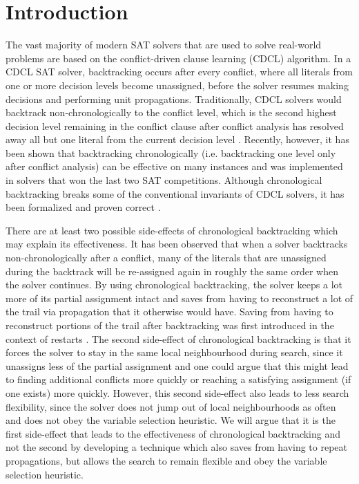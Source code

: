 \documentclass{article}
\begin{document}
\begin{abstract}
\end{abstract}

\section{Introduction}
The vast majority of modern SAT solvers that are used to solve real-world problems are based on the conflict-driven clause learning (CDCL) algorithm. In a CDCL SAT solver, backtracking occurs after every conflict, where all literals from one or more decision levels become unassigned, before the solver resumes making decisions and performing unit propagations. Traditionally, CDCL solvers would backtrack non-chronologically to the conflict level, which is the second highest decision level remaining in the conflict clause after conflict analysis has resolved away all but one literal from the current decision level \cite{DBLP:conf/dac/MoskewiczMZZM01}. Recently, however, it has been shown that backtracking chronologically (i.e. backtracking one level only after conflict analysis) \cite{DBLP:conf/lpar/2013, DBLP:conf/sat/NadelR18} can be effective on many instances and was implemented in solvers that won the last two SAT competitions. Although chronological backtracking breaks some of the conventional invariants of CDCL solvers, it has been formalized and proven correct \cite{DBLP:conf/sat/MohleB19}.

There are at least two possible side-effects of chronological backtracking which may explain its effectiveness. It has been observed that when a solver backtracks non-chronologically after a conflict, many of the literals that are unassigned during the backtrack will be re-assigned again in roughly the same order when the solver continues. By using chronological backtracking, the solver keeps a lot more of its partial assignment intact and saves from having to reconstruct a lot of the trail via propagation that it otherwise would have. Saving from having to reconstruct portions of the trail after backtracking was first introduced in the context of restarts \cite{DBLP:journals/jsat/TakRH11}. The second side-effect of chronological backtracking is that it forces the solver to stay in the same local neighbourhood during search, since it unassigns less of the partial assignment and one could argue that this might lead to finding additional conflicts more quickly or reaching a satisfying assignment (if one exists) more quickly. However, this second side-effect also leads to less search flexibility, since the solver does not jump out of local neighbourhoods as often and does not obey the variable selection heuristic. We will argue that it is the first side-effect that leads to the effectiveness of chronological backtracking and not the second by developing a technique which also saves from having to repeat propagations, but allows the search to remain flexible and obey the variable selection heuristic.
\end{document}
